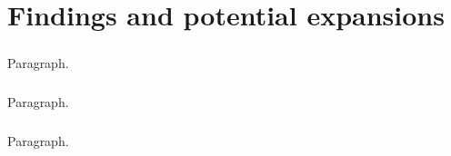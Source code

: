 \chapter{Findings and potential expansions}
\label{cha:findings}
\paragraph{}
Paragraph.

\paragraph{}
Paragraph.

\paragraph{}
Paragraph.